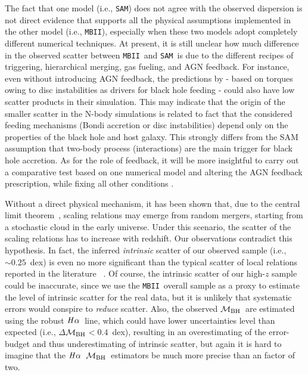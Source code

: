 \documentclass[twocolumn,trackchanges]{aastex63}
\newcommand{\mbh}{$\mathcal M_{\rm BH}$}
\newcommand{\halpha}{${\it H}\alpha$}
\newcommand{\sam}{\texttt{SAM}}
\newcommand{\mbii}{\texttt{MBII}}
\begin{document}
The fact that one model (i.e., \sam) does not agree with the observed dispersion is not direct evidence that supports all the physical assumptions implemented in the other model (i.e., \mbii), especially when these two models adopt completely different numerical techniques. At present, it is still unclear how much difference in the observed scatter between \mbii\ and \sam\ is due to the different recipes of triggering, hierarchical merging, gas fueling, and AGN feedback. For instance, even without introducing AGN feedback, the predictions by \citet{2017MNRAS.464.2840A}- based on torques owing to disc instabilities as 
 drivers for black hole feeding - could also have low scatter products in their simulation.
This may indicate that the origin of the smaller scatter in the N-body simulations is related to fact that the considered feeding mechanisms (Bondi accretion or disc instabilities) depend only on the properties of the black hole and host galaxy. This strongly differs from the SAM assumption that two-body process (interactions) are the main trigger for black hole accretion. As for the role of feedback, it will be more insightful to carry out a comparative test based on one numerical model and altering the AGN feedback prescription, while fixing all other conditions \citep[see][]{Hopkins2009}.

Without a direct physical mechanism, it has been shown that, due to the central limit theorem~\citep{Peng2007, Jahnke2011, Hirschmann2010}, scaling relations may emerge from random mergers, starting from a stochastic cloud in the early universe. Under this scenario, the scatter of the scaling relations has to increase with redshift. Our observations contradict this hypothesis. In fact, the inferred {\it intrinsic} scatter of our observed sample (i.e., $\sim0.25$~dex) is even no more significant than the typical scatter of local relations reported in the literature ~\citep[][i.e., $\gtrsim0.35$~dex]{Kormendy13, Gul++09, Reines2015}. Of course, the intrinsic scatter of our high-$z$ sample could be inaccurate, since we use the \mbii\ overall sample as a proxy to estimate the level of intrinsic scatter for the real data, but it is unlikely that systematic errors would conspire to {\it reduce} scatter.
Also, the observed \mbh\ are estimated using the robust \halpha\ line, which could have lower uncertainties level than expected (i.e., $\Delta$\mbh$<0.4$~dex), resulting in an overestimating of the error-budget and thus underestimating of intrinsic scatter, but again it is hard to imagine that the \halpha\ \mbh\ estimators be much more precise than an factor of two.
\end{document}

